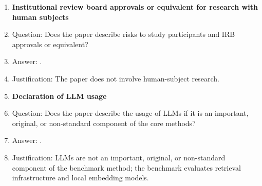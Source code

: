 \begin{enumerate}
\item {\bf Institutional review board approvals or equivalent for research with human subjects}
    \item[] Question: Does the paper describe risks to study participants and IRB approvals or equivalent?
    \item[] Answer: \answerNA{}.
    \item[] Justification: The paper does not involve human-subject research.

\item {\bf Declaration of LLM usage}
    \item[] Question: Does the paper describe the usage of LLMs if it is an important, original, or non-standard component of the core methods?
    \item[] Answer: \answerNA{}.
    \item[] Justification: LLMs are not an important, original, or non-standard component of the benchmark method; the benchmark evaluates retrieval infrastructure and local embedding models.

\end{enumerate}
